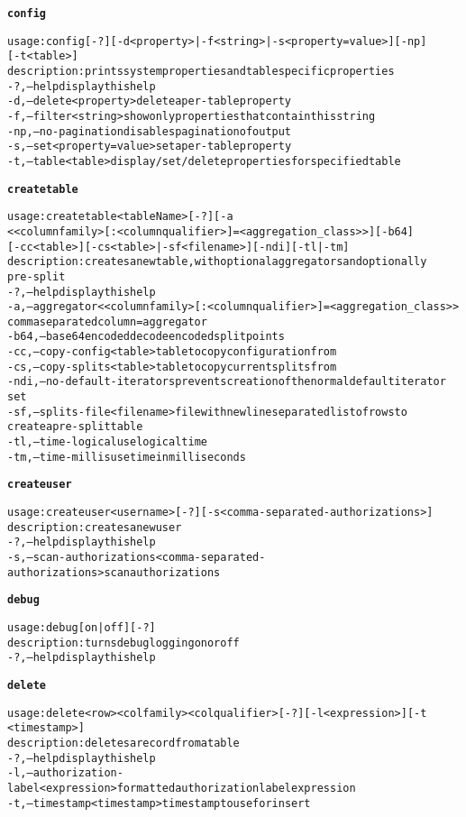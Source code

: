 \begin{alltt}
\textbf{config}

    usage: config [-?] [-d <property> | -f <string> | -s <property=value>]	[-np] 
    	      [-t <table>]
    description: prints system properties and table specific properties
      -?,--help  display this help
      -d,--delete <property>  delete a per-table property
      -f,--filter <string>	show only properties that contain this string
      -np,--no-pagination  disables pagination of output
      -s,--set <property=value>  set a per-table property
      -t,--table <table>  display/set/delete properties for specified table

\textbf{createtable}

    usage: createtable <tableName> [-?] [-a
    	      <{<columnfamily>[:<columnqualifier>]=<aggregation\_class>}>] [-b64]
    	      [-cc <table>] [-cs <table> | -sf <filename>] [-ndi]  [-tl | -tm]
    description: creates a new table, with optional aggregators and optionally
    	      pre-split
      -?,--help  display this help
      -a,--aggregator <{<columnfamily>[:<columnqualifier>]=<aggregation\_class>}> 
    	      comma separated column=aggregator
      -b64,--base64encoded	decode encoded split points
      -cc,--copy-config <table>  table to copy configuration from
      -cs,--copy-splits <table>  table to copy current splits from
      -ndi,--no-default-iterators  prevents creation of the normal default iterator
    	      set
      -sf,--splits-file <filename>	file with newline separated list of rows to
    	      create a pre-split table
      -tl,--time-logical  use logical time
      -tm,--time-millis  use time in milliseconds

\textbf{createuser}

    usage: createuser <username> [-?] [-s <comma-separated-authorizations>]
    description: creates a new user
      -?,--help  display this help
      -s,--scan-authorizations <comma-separated-authorizations>  scan authorizations

\textbf{debug}

    usage: debug [ on | off ] [-?]
    description: turns debug logging on or off
      -?,--help  display this help

\textbf{delete}

    usage: delete <row> <colfamily> <colqualifier> [-?] [-l <expression>] [-t
    	      <timestamp>]
    description: deletes a record from a table
      -?,--help  display this help
      -l,--authorization-label <expression>  formatted authorization label expression
      -t,--timestamp <timestamp>  timestamp to use for insert


\end{alltt}
